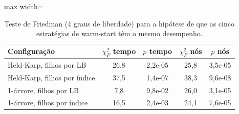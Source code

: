 \begin{table}[htb]
\centering
\caption{Teste de Friedman (4 graus de liberdade) para a hipótese de que as cinco estratégias de warm-start têm o mesmo desempenho.}
\label{tab:friedman}
\small
\begin{adjustbox}{max width=\linewidth}
\begin{tabular}{lcccc}
\toprule
Configuração & $\chi^2_F$ tempo & $p$ tempo & $\chi^2_F$ nós & $p$ nós \\
\midrule
Held-Karp, filhos por LB & 26{,}8 & 2{,}2e-05 & 25{,}8 & 3{,}5e-05 \\
Held-Karp, filhos por índice & 37{,}5 & 1{,}4e-07 & 38{,}3 & 9{,}6e-08 \\
1-árvore, filhos por LB & 7{,}8 & 9{,}8e-02 & 26{,}0 & 3{,}1e-05 \\
1-árvore, filhos por índice & 16{,}5 & 2{,}4e-03 & 24{,}1 & 7{,}6e-05 \\
\bottomrule
\end{tabular}
\end{adjustbox}
\end{table}
